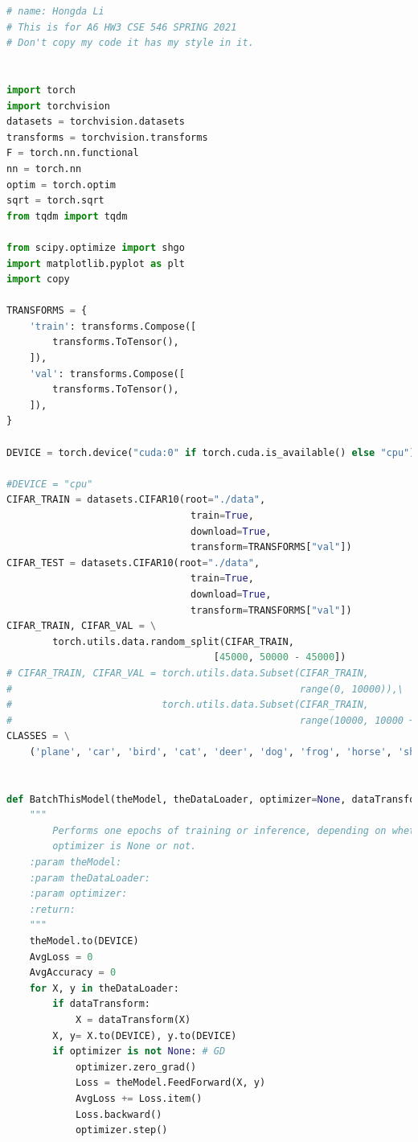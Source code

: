 \documentclass[]{article}
\begin{document}
        \begin{lstlisting}[language=python]
# name: Hongda Li
# This is for A6 HW3 CSE 546 SPRING 2021
# Don't copy my code it has my style in it.


import torch
import torchvision
datasets = torchvision.datasets
transforms = torchvision.transforms
F = torch.nn.functional
nn = torch.nn
optim = torch.optim
sqrt = torch.sqrt
from tqdm import tqdm

from scipy.optimize import shgo
import matplotlib.pyplot as plt
import copy

TRANSFORMS = {
    'train': transforms.Compose([
        transforms.ToTensor(),
    ]),
    'val': transforms.Compose([
        transforms.ToTensor(),
    ]),
}

DEVICE = torch.device("cuda:0" if torch.cuda.is_available() else "cpu")

#DEVICE = "cpu"
CIFAR_TRAIN = datasets.CIFAR10(root="./data",
                                train=True,
                                download=True,
                                transform=TRANSFORMS["val"])
CIFAR_TEST = datasets.CIFAR10(root="./data",
                                train=True,
                                download=True,
                                transform=TRANSFORMS["val"])
CIFAR_TRAIN, CIFAR_VAL = \
        torch.utils.data.random_split(CIFAR_TRAIN,
                                    [45000, 50000 - 45000])
# CIFAR_TRAIN, CIFAR_VAL = torch.utils.data.Subset(CIFAR_TRAIN,
#                                                  range(0, 10000)),\
#                          torch.utils.data.Subset(CIFAR_TRAIN,
#                                                  range(10000, 10000 + 1000))
CLASSES = \
    ('plane', 'car', 'bird', 'cat', 'deer', 'dog', 'frog', 'horse', 'ship', 'truck')


def BatchThisModel(theModel, theDataLoader, optimizer=None, dataTransform:callable=None):
    """
        Performs one epochs of training or inference, depending on whether
        optimizer is None or not.
    :param theModel:
    :param theDataLoader:
    :param optimizer:
    :return:
    """
    theModel.to(DEVICE)
    AvgLoss = 0
    AvgAccuracy = 0
    for X, y in theDataLoader:
        if dataTransform:
            X = dataTransform(X)
        X, y= X.to(DEVICE), y.to(DEVICE)
        if optimizer is not None: # GD
            optimizer.zero_grad()
            Loss = theModel.FeedForward(X, y)
            AvgLoss += Loss.item()
            Loss.backward()
            optimizer.step()


\end{lstlisting}
\end{document}
